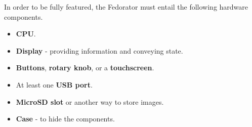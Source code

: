         
        
        In order to be fully featured, the Fedorator must entail the following hardware components.
        \begin{itemize}
            \item \textbf{CPU}.
            \item \textbf{Display} - providing information and conveying state.
            \item \textbf{Buttons}, \textbf{rotary knob}, or a \textbf{touchscreen}.
            \item At least one \textbf{USB port}.
            \item \textbf{MicroSD slot} or another way to store images.
            \item \textbf{Case} - to hide the components.
        \end{itemize}
        
